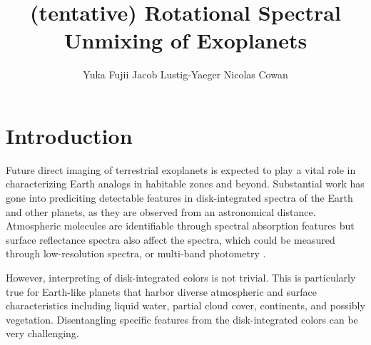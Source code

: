 \documentclass[iop,numberedappendix,apj,]{emulateapj}
\begin{document}
\title{(tentative) Rotational Spectral Unmixing of Exoplanets}


\author{
%
Yuka Fujii 
%
Jacob Lustig-Yaeger 
%
Nicolas Cowan 
%
}

      
  
  



\vspace{0.5\baselineskip}


\begin{abstract}

\end{abstract}

  



\section{Introduction}
\label{sec:intro}

Future direct imaging of terrestrial exoplanets is expected to play a vital role in characterizing Earth analogs in habitable zones and beyond. 
Substantial work has gone into prediciting detectable features in disk-integrated spectra of the Earth and other planets, as they are observed from an astronomical distance. 
Atmospheric molecules are identifiable through spectral absorption features \citep[e.g.,][]{DesMarais2002} but surface reflectance spectra also affect the spectra, which could be measured through low-resolution spectra, or multi-band photometry \citep[e.g.,][]{Ford2001}. 

However, interpreting of disk-integrated colors is not trivial. 
This is particularly true for Earth-like planets that harbor diverse atmospheric and surface characteristics including liquid water, partial cloud cover, continents, and possibly vegetation. 
Disentangling specific features from the disk-integrated colors can be very challenging. 
\end{document}
